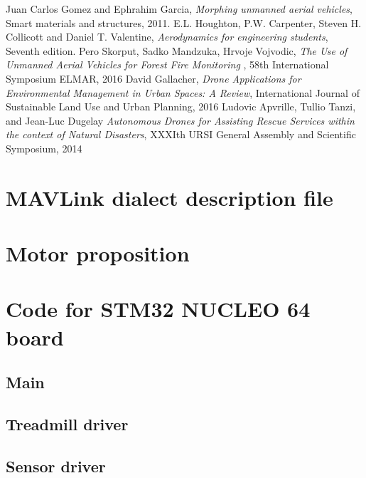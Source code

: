 \documentclass[12pt,a4paper, twoside]{article}
\begin{document}
\begin{thebibliography}{100}
	 Juan Carlos Gomez and Ephrahim Garcia, \textit{Morphing unmanned aerial vehicles}, Smart materials and structures, 2011.
	 E.L. Houghton, P.W. Carpenter, Steven H. Collicott and Daniel T. Valentine, \textit{Aerodynamics for engineering students}, Seventh edition.
	 Pero Skorput, Sadko Mandzuka, Hrvoje Vojvodic, \textit{The Use of Unmanned Aerial Vehicles for Forest Fire Monitoring }, 58th International Symposium ELMAR, 2016
	 David Gallacher, \textit{Drone Applications for Environmental Management in Urban Spaces: A Review}, International Journal of Sustainable Land Use and Urban Planning, 2016
	 Ludovic Apvrille, Tullio Tanzi, and Jean-Luc Dugelay \textit{Autonomous Drones for Assisting Rescue Services within the context of Natural Disasters}, XXXIth URSI General Assembly and Scientific Symposium, 2014
\end{thebibliography}

\listoffigures
\listoftables
\appendix
\section{MAVLink dialect description file}\label{app:mavlink}

\section{Motor proposition}\label{app:motor}

\section{Code for STM32 NUCLEO 64 board}
\subsection{Main}


\subsection{Treadmill driver}


\subsection{Sensor driver}


\end{document}
